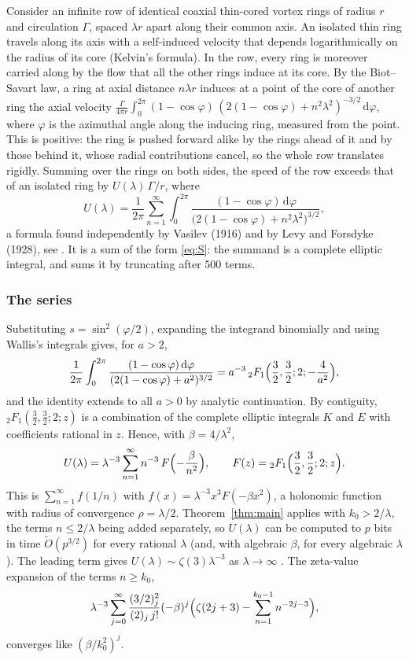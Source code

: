 \documentclass[11pt,reqno]{amsart}
\theoremstyle{definition}
\theoremstyle{remark}
\newcommand{\dd}{\,\mathrm{d}}
\begin{document}
Consider an infinite row of identical coaxial thin-cored vortex rings of radius $r$ and circulation $\Gamma$, spaced
$\lambda r$ apart along their common axis. An isolated thin ring travels along its axis with a self-induced velocity
that depends logarithmically on the radius of its core (Kelvin's formula). In the row, every ring is moreover carried
along by the flow that all the other rings induce at its core. By the Biot--Savart law, a ring at axial distance
$n\lambda r$ induces at a point of the core of another ring the axial velocity
$\frac{\Gamma}{4\pi r}\int_0^{2\pi}(1-\cos\varphi)\,(2(1-\cos\varphi)+n^2\lambda^2)^{-3/2}\dd\varphi$, where $\varphi$ is the
azimuthal angle along the inducing ring, measured from the point. This is positive: the ring is pushed forward
alike by the rings ahead of it and by those behind it, whose radial contributions cancel, so the whole row translates
rigidly. Summing over the rings on both sides, the speed of the row exceeds that of an isolated ring by
$U(\lambda)\,\Gamma/r$, where
\begin{equation}\label{eq:vortex}
  U(\lambda) = \frac{1}{2\pi}\sum_{n=1}^{\infty}\int_0^{2\pi}\frac{(1-\cos\varphi)\dd\varphi}{\bigl(2(1-\cos\varphi)+n^2\lambda^2\bigr)^{3/2}},
\end{equation}
a formula found independently by Vasilev (1916) and by Levy and Forsdyke (1928), see \cite{MS22}. It is a sum of the
form \eqref{eq:S}: the summand is a complete elliptic integral, and \cite{MS22} sums it by truncating after $500$ terms.

\subsubsection{The series}
Substituting $s = \sin^2(\varphi/2)$, expanding the integrand binomially and using Wallis's integrals gives, for $a > 2$,
\[
  \frac1{2\pi}\int_0^{2\pi}\frac{(1-\cos\varphi)\dd\varphi}{(2(1-\cos\varphi)+a^2)^{3/2}}
  = a^{-3}\,{}_2F_1\Bigl(\frac32,\frac32;2;-\frac4{a^2}\Bigr),
\]
and the identity extends to all $a > 0$ by analytic continuation. By contiguity, ${}_2F_1(\frac32,\frac32;2;z)$ is a
combination of the complete elliptic integrals $K$ and $E$ with coefficients rational in $z$. Hence, with
$\beta = 4/\lambda^2$,
\[
  U(\lambda) = \lambda^{-3}\sum_{n=1}^{\infty} n^{-3}\,F\Bigl(-\frac{\beta}{n^2}\Bigr), \qquad F(z) = {}_2F_1\Bigl(\frac32,\frac32;2;z\Bigr).
\]
This is $\sum_{n=1}^{\infty} f(1/n)$ with $f(x) = \lambda^{-3}x^3F(-\beta x^2)$, a holonomic function with radius of convergence
$\rho = \lambda/2$. Theorem~\ref{thm:main} applies with $k_0 > 2/\lambda$, the terms $n \le 2/\lambda$ being added
separately, so $U(\lambda)$ can be computed to $p$ bits in time $\widetilde O(p^{3/2})$ for every rational $\lambda$ (and,
with algebraic $\beta$, for every algebraic $\lambda$). The leading term gives $U(\lambda) \sim \zeta(3)\lambda^{-3}$ as
$\lambda \to \infty$ \cite{MS22}. The zeta-value expansion of the terms $n \ge k_0$,
\[
  \lambda^{-3}\sum_{j=0}^{\infty}\frac{(3/2)_j^2}{(2)_j\,j!}(-\beta)^j\Bigl(\zeta(2j+3) - \sum_{n=1}^{k_0-1}n^{-2j-3}\Bigr),
\]
converges like $(\beta/k_0^2)^j$.
\end{document}
